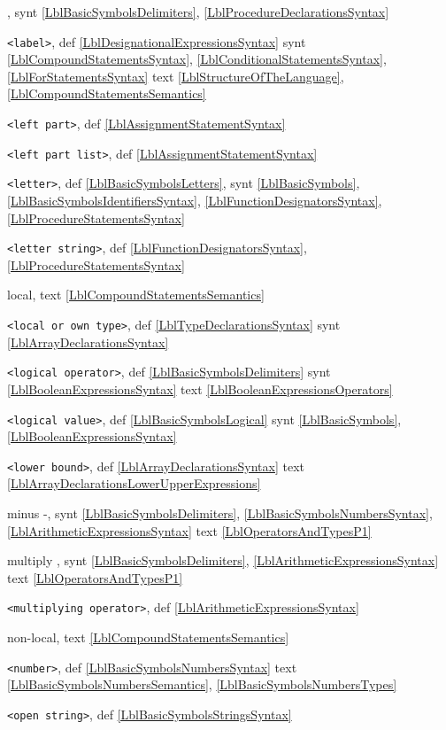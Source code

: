 \documentclass[a4paper,11pt]{article}
\begin{document}
,
synt
\ref{LblBasicSymbolsDelimiters},
\ref{LblProcedureDeclarationsSyntax}\*

\texttt{<label>},
def
\ref{LblDesignationalExpressionsSyntax}
synt
\ref{LblCompoundStatementsSyntax},
\ref{LblConditionalStatementsSyntax},
\ref{LblForStatementsSyntax}
text
\ref{LblStructureOfTheLanguage},
\ref{LblCompoundStatementsSemantics}\*

\texttt{<left part>},
def
\ref{LblAssignmentStatementSyntax}\*

\texttt{<left part list>},
def
\ref{LblAssignmentStatementSyntax}\*

\texttt{<letter>},
def
\ref{LblBasicSymbolsLetters},
synt
\ref{LblBasicSymbols},
\ref{LblBasicSymbolsIdentifiersSyntax},
\ref{LblFunctionDesignatorsSyntax},
\ref{LblProcedureStatementsSyntax}\*

\texttt{<letter string>},
def
\ref{LblFunctionDesignatorsSyntax},
\ref{LblProcedureStatementsSyntax}\*

local, text
\ref{LblCompoundStatementsSemantics}\*

\texttt{<local or own type>},
def
\ref{LblTypeDeclarationsSyntax}
synt
\ref{LblArrayDeclarationsSyntax}\*

\texttt{<logical operator>},
def
\ref{LblBasicSymbolsDelimiters}
synt
\ref{LblBooleanExpressionsSyntax}
text
\ref{LblBooleanExpressionsOperators}\*

\texttt{<logical value>},
def
\ref{LblBasicSymbolsLogical}
synt
\ref{LblBasicSymbols},
\ref{LblBooleanExpressionsSyntax}\*

\texttt{<lower bound>},
def
\ref{LblArrayDeclarationsSyntax}
text
\ref{LblArrayDeclarationsLowerUpperExpressions}\*

minus -,
synt
\ref{LblBasicSymbolsDelimiters},
\ref{LblBasicSymbolsNumbersSyntax},
\ref{LblArithmeticExpressionsSyntax}
text
\ref{LblOperatorsAndTypesP1}\*

multiply \mtim{},
synt
\ref{LblBasicSymbolsDelimiters},
\ref{LblArithmeticExpressionsSyntax}
text
\ref{LblOperatorsAndTypesP1}\*

\texttt{<multiplying operator>},
def
\ref{LblArithmeticExpressionsSyntax}\*

non-local,
text
\ref{LblCompoundStatementsSemantics}\*

\texttt{<number>},
def
\ref{LblBasicSymbolsNumbersSyntax}
text
\ref{LblBasicSymbolsNumbersSemantics},
\ref{LblBasicSymbolsNumbersTypes}\*

\texttt{<open string>},
def
\ref{LblBasicSymbolsStringsSyntax}\*
\end{document}
